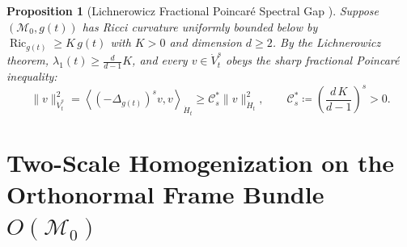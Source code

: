 \documentclass[11pt,a4paper,reqno]{article}
\theoremstyle{plain}
\newtheorem{proposition}[theorem]{Proposition}
\theoremstyle{definition}
\theoremstyle{remark}
\numberwithin{equation}{section}
\begin{document}
\begin{proposition}[Lichnerowicz Fractional Poincar\'e Spectral Gap \cite{lichnerowicz1958geometrie, ananda2026stochastic_fluid_v2}]\label{prop:lichnerowicz_gap}
Suppose $(\mathcal{M}_0, g(t))$ has Ricci curvature uniformly bounded below by $\operatorname{Ric}_{g(t)} \ge K\,g(t)$ with $K > 0$ and dimension $d \ge 2$. By the Lichnerowicz theorem, $\lambda_1(t) \ge \frac{d}{d-1}K$, and every $v \in \dot{V}_t^s$ obeys the sharp fractional Poincar\'e inequality:
\begin{equation}\label{eq:fractional_poincare}
  \|v\|_{\dot{V}_t^s}^2 = \left\langle (-\Delta_{g(t)})^s v, v \right\rangle_{\dot{H}_t} \ge \mathcal{C}_s^* \|v\|_{\dot{H}_t}^2, \qquad \mathcal{C}_s^* \coloneqq \left( \frac{d\,K}{d-1} \right)^s > 0.
\end{equation}
\end{proposition}

\section{Two-Scale Homogenization on the Orthonormal Frame Bundle \texorpdfstring{$O(\mathcal{M}_0)$}{O(M0)}}
\label{sec:frame_bundle}
\end{document}
